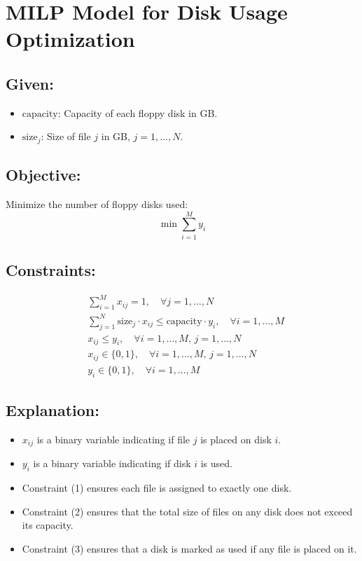 \documentclass{article}
\begin{document}
\section*{MILP Model for Disk Usage Optimization}

\subsection*{Given:}
\begin{itemize}
    \item \(\text{capacity}\): Capacity of each floppy disk in GB.
    \item \(\text{size}_j\): Size of file \(j\) in GB, \(j = 1, \ldots, N\).
\end{itemize}

\subsection*{Objective:}
Minimize the number of floppy disks used:
\[
\min \sum_{i=1}^{M} y_i
\]

\subsection*{Constraints:}
\begin{align}
    & \sum_{i=1}^{M} x_{ij} = 1, \quad \forall j = 1, \ldots, N \\
    & \sum_{j=1}^{N} \text{size}_j \cdot x_{ij} \leq \text{capacity} \cdot y_i, \quad \forall i = 1, \ldots, M \\
    & x_{ij} \leq y_i, \quad \forall i = 1, \ldots, M, \, j = 1, \ldots, N \\
    & x_{ij} \in \{0, 1\}, \quad \forall i = 1, \ldots, M, \, j = 1, \ldots, N \\
    & y_i \in \{0, 1\}, \quad \forall i = 1, \ldots, M
\end{align}

\subsection*{Explanation:}
\begin{itemize}
    \item \(x_{ij}\) is a binary variable indicating if file \(j\) is placed on disk \(i\).
    \item \(y_i\) is a binary variable indicating if disk \(i\) is used.
    \item Constraint (1) ensures each file is assigned to exactly one disk.
    \item Constraint (2) ensures that the total size of files on any disk does not exceed its capacity.
    \item Constraint (3) ensures that a disk is marked as used if any file is placed on it.
\end{itemize}
\end{document}
